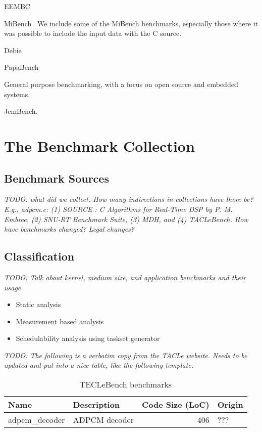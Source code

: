 \documentclass[a4paper,UKenglish]{oasics}
\newcommand{\todo}[1]{{\emph{TODO: #1}}}
\begin{document}
EEMBC

MiBench~\cite{MiBench} We include some of the MiBench benchmarks, especially
those where it was possible to include the input data with the C source.

Debie~\cite{debie}

PapaBench~\cite{papabench}

General purpose benchmarking, with a focus on open source and embedded systems.

JemBench.

\section{The Benchmark Collection}
\label{sec:collect}


\subsection{Benchmark Sources}

\todo{what did we collect. How many indirections in collections have there be?
E.g., adpcm.c: (1) SOURCE : C Algorithms for Real-Time DSP by P. M. Embree,
(2) SNU-RT Benchmark Suite, (3) MDH, and (4) TACLeBench. How have
benchmarks  changed? Legal changes?}

\subsection{Classification}

\todo{Talk about kernel, medium size, and application benchmarks and their usage.}
\begin{itemize}
\item Static analysis
\item Measurement based analysis
\item Schedulability analysis using taskset generator
\end{itemize}

\todo{The following is a verbatim copy from the TACLe website.
Needs to be updated and put into a nice table, like the following template.}

\begin{table}
  \centering
  \caption{TECLeBench benchmarks}
  \label{tab:bench}
  \begin{tabular}{llrl}
    \toprule
    Name & Description & Code Size (LoC) & Origin \\
    \midrule
    adpcm\_decoder & ADPCM decoder & 406 & ??? \\
    \bottomrule
  \end{tabular}
\end{table}
\end{document}
